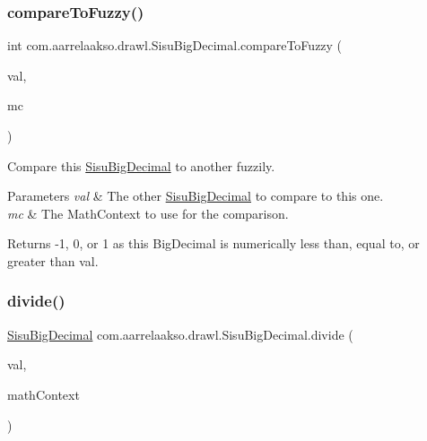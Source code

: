 \subsubsection{\texorpdfstring{compare\+To\+Fuzzy()}{compareToFuzzy()}\hspace{0.1cm}{\footnotesize\ttfamily [2/2]}}
{\footnotesize\ttfamily int com.\+aarrelaakso.\+drawl.\+Sisu\+Big\+Decimal.\+compare\+To\+Fuzzy (\begin{DoxyParamCaption}\item[{\hyperlink{classcom_1_1aarrelaakso_1_1drawl_1_1_sisu_big_decimal}{Sisu\+Big\+Decimal}}]{val,  }\item[{Math\+Context}]{mc }\end{DoxyParamCaption})\hspace{0.3cm}{\ttfamily [protected]}}

Compare this \hyperlink{classcom_1_1aarrelaakso_1_1drawl_1_1_sisu_big_decimal}{Sisu\+Big\+Decimal} to another fuzzily.


\begin{DoxyParams}{Parameters}
{\em val} & The other \hyperlink{classcom_1_1aarrelaakso_1_1drawl_1_1_sisu_big_decimal}{Sisu\+Big\+Decimal} to compare to this one. \\
\hline
{\em mc} & The Math\+Context to use for the comparison. \\
\hline
\end{DoxyParams}
\begin{DoxyReturn}{Returns}
-\/1, 0, or 1 as this Big\+Decimal is numerically less than, equal to, or greater than val. 
\end{DoxyReturn}
\mbox{\label{classcom_1_1aarrelaakso_1_1drawl_1_1_sisu_big_decimal_ac1dbd016deb958fa7332bf3a777d14e2}} 
\subsubsection{\texorpdfstring{divide()}{divide()}\hspace{0.1cm}{\footnotesize\ttfamily [1/3]}}
{\footnotesize\ttfamily \hyperlink{classcom_1_1aarrelaakso_1_1drawl_1_1_sisu_big_decimal}{Sisu\+Big\+Decimal} com.\+aarrelaakso.\+drawl.\+Sisu\+Big\+Decimal.\+divide (\begin{DoxyParamCaption}\item[{\hyperlink{classcom_1_1aarrelaakso_1_1drawl_1_1_sisu_big_decimal}{Sisu\+Big\+Decimal}}]{val,  }\item[{Math\+Context}]{math\+Context }\end{DoxyParamCaption})\hspace{0.3cm}{\ttfamily [protected]}}

